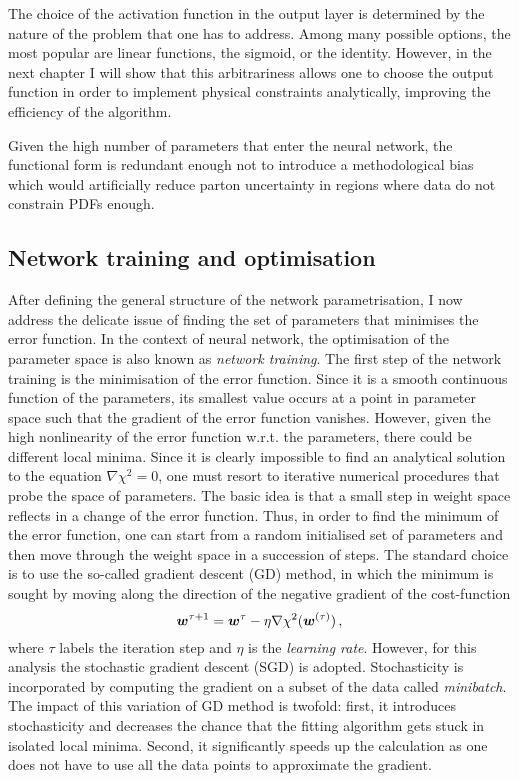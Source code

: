 The choice of the activation function in the output layer is determined by the nature of the problem that one has to address. Among many possible options, the most popular are linear functions, the sigmoid, or the identity. However, in the next chapter I will show that this arbitrariness allows one to choose the output function in order to implement physical constraints analytically, improving the efficiency of the algorithm.%

Given the high number of parameters that enter the neural network, the functional form is redundant enough not to introduce a methodological bias which would artificially reduce parton uncertainty in regions where data do not constrain PDFs enough.


\subsection{Network training and optimisation}
\label{sec:NNtr}
After defining the general structure of the network parametrisation, I now address the delicate issue of finding the set of parameters that minimises the error function. In the context of neural network, the optimisation of the parameter space is also known as \textit{network training}. The first step of the network training is the minimisation of the error function. Since it is a smooth continuous function of the parameters, its smallest value occurs at a point in parameter space such that the gradient of the error function vanishes. However, given the high nonlinearity of the error function w.r.t. the parameters, there could be different local minima. Since it is clearly impossible to find an analytical solution to the equation $\nabla \chi^2 = 0$, one must resort to iterative numerical procedures that probe the space of parameters. The basic idea is that a small step in weight space reflects in a change of the error function. Thus, in order to find the minimum of the error function, one can start from a random initialised set of parameters and then move through the weight space in a succession of steps. The standard choice is to use the so-called gradient descent (GD) method, in which the minimum is sought by moving along the direction of the negative gradient of the cost-function
\begin{equation}
  \vb*{w}^{\tau + 1} = \vb*{w}^{\tau} - \eta \nabla \chi^2 (\vb*{w}^{(\tau)}) \,,
  \label{eq:GD}
\end{equation}
where $\tau$ labels the iteration step and $\eta$ is the \textit{learning rate}. However, for this analysis the stochastic gradient descent (SGD) is adopted. Stochasticity is incorporated by computing the gradient on a subset of the data called \textit{minibatch}. The impact of this variation of GD method is twofold: first, it introduces stochasticity and decreases the chance that the fitting algorithm gets stuck in isolated local minima. Second, it significantly speeds up the calculation as one does not have to use all the data points to approximate the gradient.%

